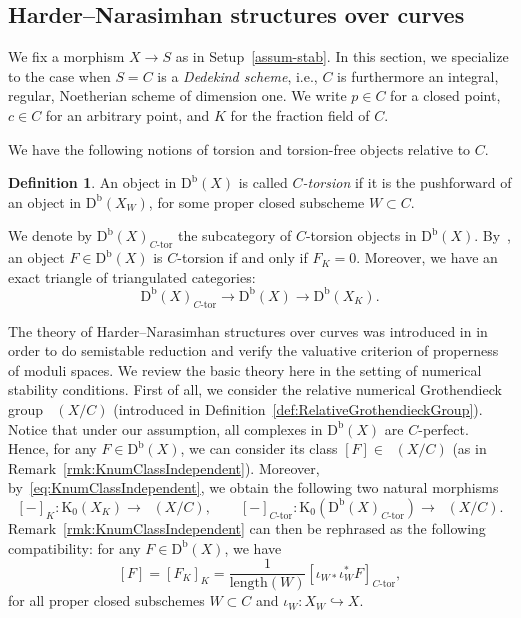 \documentclass[11pt, reqno]{amsart}
\numberwithin{equation}{section}
\theoremstyle{plain}
\theoremstyle{remark}
\theoremstyle{definition}
\newtheorem{definition}[theorem]{Definition}
\theoremstyle{italicsname}
\def\Ctor{{\ensuremath{C\text{-}\mathrm{tor}}}}
\newcommand{\Db}{\mathrm{D^b}}
\newcommand{\num}{\mathrm{num}}
\DeclareMathOperator{\Knum}{\rK_{\num}}
\newcommand{\rK}{\mathrm{K}}
\begin{document}
\subsection{Harder--Narasimhan structures over curves}\label{subsec:HNstructure}

We fix a morphism $X\to S$ as in Setup~\ref{assum-stab}.
In this section, we specialize to the case when $S=C$ is a \emph{Dedekind scheme}, i.e., $C$ is furthermore an integral, regular, Noetherian scheme of dimension one. 
We write $p\in C$ for a closed point, $c\in C$ for an arbitrary point, and $K$ for the fraction field of $C$.

We have the following notions of torsion and torsion-free objects relative to $C$.

\begin{definition}
An object in $\Db(X)$ is called \emph{$C$-torsion} if it is the pushforward of an object in $\Db(X_W)$, for some proper closed subscheme $W\subset C$. 
\end{definition}

We denote by $\Db(X)_{\Ctor}$ the subcategory of $C$-torsion objects in $\Db(X)$.
By~\cite[Lemma 6.4]{stability-families}, an object $F\in\Db(X)$ is $C$-torsion if and only if $F_K=0$. 
Moreover, we have an exact triangle of triangulated categories:
\[
\Db(X)_{\Ctor}\longrightarrow\Db(X)\longrightarrow\Db(X_{K}).
\]

The theory of Harder--Narasimhan structures over curves was introduced in \cite[Section 13]{stability-families} in order to do semistable reduction and verify the valuative criterion of properness of moduli spaces.
We review the basic theory here in the setting of numerical stability conditions.
First of all, we consider the relative numerical Grothendieck group $\Knum(X/C)$ (introduced in Definition~\ref{def:RelativeGrothendieckGroup}).
Notice that under our assumption, all complexes in $\Db(X)$ are $C$-perfect.
Hence, for any $F\in\Db(X)$, we can consider its class $[F]\in\Knum(X/C)$ (as in Remark~\ref{rmk:KnumClassIndependent}).
Moreover, by~\eqref{eq:KnumClassIndependent}, we obtain the following two natural morphisms
\[
[-]_K\colon\rK_0(X_K)\longrightarrow\Knum(X/C),\qquad[-]_{\Ctor}\colon\rK_0(\Db(X)_{\Ctor})\longrightarrow\Knum(X/C).
\]
Remark~\ref{rmk:KnumClassIndependent} can then be rephrased as the following compatibility: for any $F\in\Db(X)$, we have
\[
[F]=[F_K]_K=\frac{1}{\mathrm{length}(W)}[\iota_{W*}\iota_{W}^*F]_{\Ctor},
\]
for all proper closed subschemes $W\subset C$ and $\iota_W\colon X_W\hookrightarrow X$.
\end{document}
